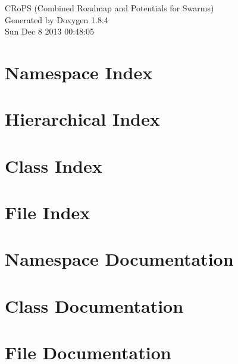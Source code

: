 \documentclass[twoside]{book}
\newcommand{\clearemptydoublepage}{%
  \newpage{\pagestyle{empty}\cleardoublepage}%
}
\begin{document}
\hypersetup{pageanchor=false}
\begin{titlepage}
\vspace*{7cm}
\begin{center}%
{\Large C\-Ro\-P\-S (Combined Roadmap and Potentials for Swarms) }\\
\vspace*{1cm}
{\large Generated by Doxygen 1.8.4}\\
\vspace*{0.5cm}
{\small Sun Dec 8 2013 00:48:05}\\
\end{center}
\end{titlepage}
\clearemptydoublepage
\tableofcontents
\clearemptydoublepage
{}
\hypersetup{pageanchor=true}

\chapter{Namespace Index}

\chapter{Hierarchical Index}

\chapter{Class Index}

\chapter{File Index}

\chapter{Namespace Documentation}











\chapter{Class Documentation}









\chapter{File Documentation}












\newpage
{}
{}
\printindex
\end{document}
